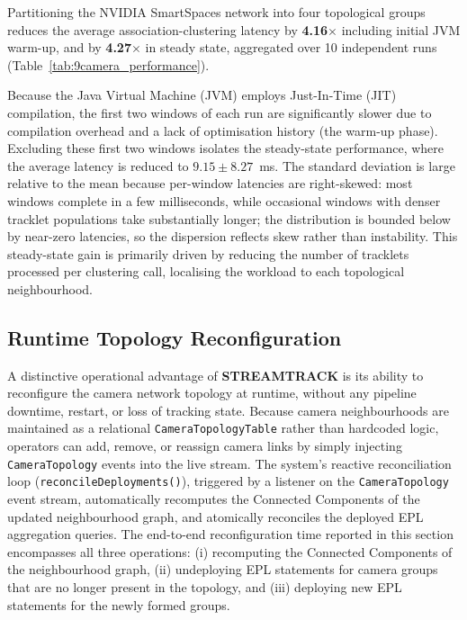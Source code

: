 \documentclass[5p,times]{elsarticle}
\begin{document}
Partitioning the NVIDIA SmartSpaces network into four topological groups reduces the average association-clustering latency by \textbf{4.16$\times$} including initial JVM warm-up, and by \textbf{4.27$\times$} in steady state, aggregated over 10 independent runs (Table~\ref{tab:9camera_performance}).

Because the Java Virtual Machine (JVM) employs Just-In-Time (JIT) compilation, the first two windows of each run are significantly slower due to compilation overhead and a lack of optimisation history (the warm-up phase). Excluding these first two windows isolates the steady-state performance, where the average latency is reduced to $9.15 \pm 8.27$~ms. The standard deviation is large relative to the mean because per-window latencies are
right-skewed: most windows complete in a few milliseconds, while occasional windows with denser tracklet populations take substantially longer; the distribution is bounded below by near-zero latencies, so the dispersion reflects skew rather than instability. This
steady-state gain is primarily driven by reducing the number of tracklets processed per clustering call, localising the workload to each topological neighbourhood.


\subsection{Runtime Topology Reconfiguration}
\label{sec:eval:reconfig}

A distinctive operational advantage of \textbf{STREAMTRACK} is its ability to reconfigure the camera network topology at runtime, without any pipeline downtime, restart, or loss of tracking state. Because camera neighbourhoods are maintained as a relational \texttt{CameraTopologyTable} rather than hardcoded logic, operators can add, remove, or reassign camera links by simply injecting \texttt{CameraTopology} events into the live stream. The system's reactive reconciliation loop (\texttt{reconcileDeployments()}), triggered by a listener on the \texttt{CameraTopology} event stream, automatically recomputes the Connected Components of the updated neighbourhood graph, and atomically reconciles the deployed EPL aggregation queries. The end-to-end reconfiguration time reported in this section encompasses all three operations: (i) recomputing the Connected Components of the neighbourhood graph, (ii) undeploying EPL statements for camera groups that are no longer present in the topology, and (iii) deploying new EPL statements for the newly formed groups.
\end{document}
